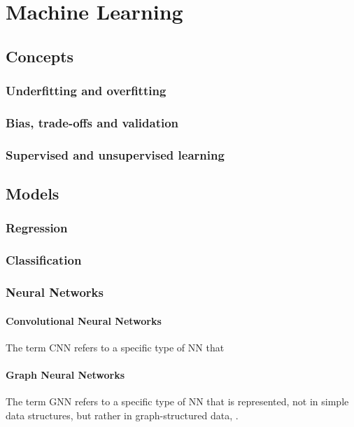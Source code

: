 \section{Machine Learning}\label{sec:ml}

\subsection{Concepts}

\subsubsection{Underfitting and overfitting}

\subsubsection{Bias, trade-offs and validation}

\subsubsection{Supervised and unsupervised learning}

\subsection{Models}

\subsubsection{Regression}

\subsubsection{Classification}

\subsubsection{Neural Networks}

\paragraph*{Convolutional Neural Networks}

The term \ac{CNN} refers to a specific type of \ac{NN} that 

\paragraph*{Graph Neural Networks}

The term \ac{GNN} refers to a specific type of \ac{NN} that is represented, not in simple data structures, but rather in graph-structured data, \cite{GNN2022}.
